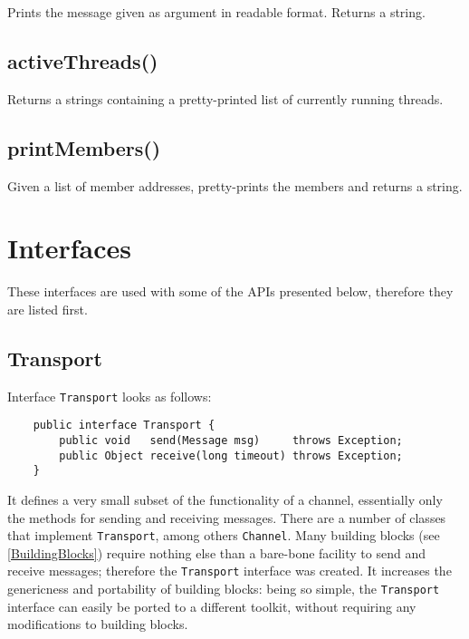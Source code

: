     Prints the message given as argument in readable format. Returns a string.

    \subsection{activeThreads()}

    Returns a strings containing a pretty-printed list of currently running threads.

    \subsection{printMembers()}

    Given a list of member addresses, pretty-prints the members and returns a string.


  \section{Interfaces}

  These interfaces are used with some of the APIs presented below, therefore they are
  listed first.

    \subsection{Transport}

    Interface {\tt Transport} looks as follows:

    \begin{small}
    \begin{verbatim}
    public interface Transport {    
        public void   send(Message msg)     throws Exception;
        public Object receive(long timeout) throws Exception;
    }
    \end{verbatim}
    \end{small}

    It defines a very small subset of the functionality of a channel, essentially
    only the methods for sending and receiving messages. There are a number of
    classes that implement {\tt Transport}, among others {\tt Channel}. Many
    building blocks (see \ref{BuildingBlocks}) require nothing else than a bare-bone
    facility to send and receive messages; therefore the {\tt Transport} interface
    was created. It increases the genericness and portability of building blocks:
    being so simple, the {\tt Transport} interface can easily be ported to a
    different toolkit, without requiring any modifications to building blocks.
	

